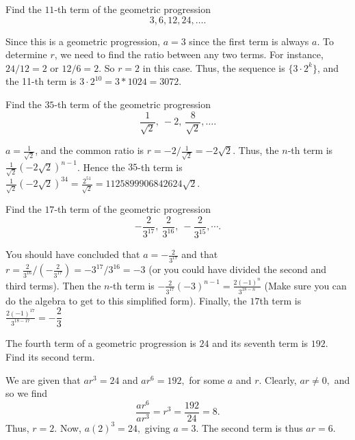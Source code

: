 \begin{exa}
Find the $11$-th term of the geometric progression
$$3, 6, 12, 24, \ldots . $$
 \begin{sol}  
Since this is a geometric progression, $a=3$ since the first term is always $a$. To determine $r$, we need to find the ratio between any two terms.
For instance, $24/12=2$ or $12/6=2$. So $r=2$ in this case.
Thus, the sequence is $\{3\cdot 2^k\}$, and the 11-th term is
$3\cdot 2^{10}=3*1024=3072$. 
\end{sol}
\end{exa}


\begin{exa}
Find the $35$-th term of the geometric progression
$$\frac{1}{\sqrt{2}},\  -2, \ \frac{8}{\sqrt{2}}, \ldots . $$
 \begin{sol}   
$a=\frac{1}{\sqrt{2}}$, and the common ratio is 
$r=-2/\frac{1}{\sqrt{2}} = -2\sqrt{2}$. 
Thus, the $n$-th term is $\frac{1}{\sqrt{2}}\left(-2\sqrt{2}\right)^{n-1}$.
Hence the $35$-th term is
$\frac{1}{\sqrt{2}}\left(-2\sqrt{2}\right)^{34} = \frac{2^{51}}{\sqrt{2}} =
1125899906842624\sqrt{2}.$
\end{sol}
\end{exa}

\begin{exer}
Find the $17$-th term of the geometric progression
$$-\frac{2}{3^{17}},\ \frac{2}{3^{16}},\ -\frac{2}{3^{15}}, \cdots . $$
\vspace*{1in}
\begin{answer}
You should have concluded that $a=-\frac{2}{3^{17}}$ and that
$r=\frac{2}{3^{16}}/\left(-\frac{2}{3^{17}}\right)=-3^{17}/3^{16}=-3$
(or you could have divided the second and third terms).
Then the $n$-th term is
$-\frac{2}{3^{17}}\left(-3\right)^{n-1}=\frac{2(-1)^{n}}{3^{18-n}}$
(Make sure you can do the algebra to get to this simplified form).
Finally, the $17$th term is
$\frac{2(-1)^{17}}{3^{18-17}}=-\dfrac{2}{3}$
\end{answer}
\end{exer}

\begin{exa}
The fourth term of a geometric progression is $24$ and its seventh
term is $192.$ Find its second term.
\begin{sol} 
We are given that $ar^3 = 24$ and $ar^6 = 192,$
for some $a$ and $r$. Clearly, $ar \neq 0,$ and so we find
$$\frac{ar^6}{ar^3} = r^3 = \frac{192}{24}  = 8.$$ 
Thus, $r = 2$.
Now, $a(2)^3 = 24,$ giving $a = 3.$ The second term is thus $ar =
6.$
\end{sol}
\end{exa}


